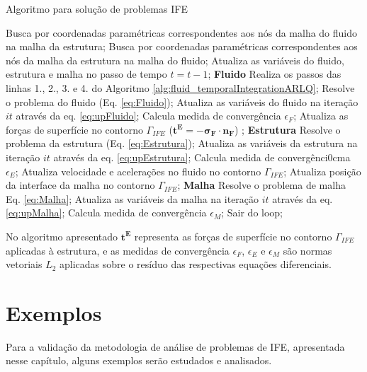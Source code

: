 \documentclass[tese_patricia]{subfiles}
\begin{document}
\begin{algorithm}
	\caption{Algoritmo para solução de problemas IFE}
	\label{alg:IFE}
	\begin{algorithmic}[1]
		\State Busca por coordenadas paramétricas correspondentes aos nós da malha do fluido na malha da estrutura;
		\State Busca por coordenadas paramétricas correspondentes aos nós da malha da estrutura na malha do fluido;
		\State Atualiza as variáveis do fluido, estrutura e malha no passo de tempo $t = t-1$;
		\State \textbf{Fluido}
		\State Realiza os passos das linhas 1., 2., 3. e 4. do Algoritmo \ref{alg:fluid_temporalIntegrationARLQ};
		\State Resolve o problema do fluido (Eq. \eqref{eq:Fluido});
		\State Atualiza as variáveis do fluido na iteração $it$ através da eq. \ref{eq:upFluido};
		\State Calcula medida de convergência $\epsilon_F$;
		\State Atualiza as forças de superfície no contorno  $\Gamma_{IFE}$ ($\boldsymbol{t^{E}} = -\boldsymbol{\sigma_{F}} \cdot \boldsymbol{n_{F}}$) ;
		\State \textbf{Estrutura}
		\State Resolve o problema da estrutura (Eq. \eqref{eq:Estrutura});
		\State Atualiza as variáveis da estrutura na iteração $it$ através da eq. \eqref{eq:upEstrutura};
		\State Calcula medida de convergênci0cma $\epsilon_E$;
		\State Atualiza velocidade e acelerações no fluido no contorno  $\Gamma_{IFE}$;
		\State Atualiza posição da interface da malha no contorno  $\Gamma_{IFE}$;
		\State \textbf{Malha}
		\State Resolve o problema de malha Eq. \eqref{eq:Malha};
		\State Atualiza as variáveis da malha na iteração $it$ através da eq. \eqref{eq:upMalha};
		\State Calcula medida de convergência $\epsilon_M$;
		\State Sair do loop;
		\EndIf
		\EndFor
		\EndFor
	\end{algorithmic}
\end{algorithm}

No algoritmo apresentado $\boldsymbol{t^{E}}$ representa as forças de superfície no contorno $\Gamma_{IFE}$ aplicadas à estrutura, e as medidas de convergência $\epsilon_F$, $\epsilon_E$ e $\epsilon_M$ são normas vetoriais $L_2$ aplicadas sobre o resíduo das respectivas equações diferenciais.


\section{Exemplos}

Para a validação da metodologia de análise de problemas de IFE, apresentada nesse capítulo, alguns exemplos serão estudados e analisados.
\end{document}
